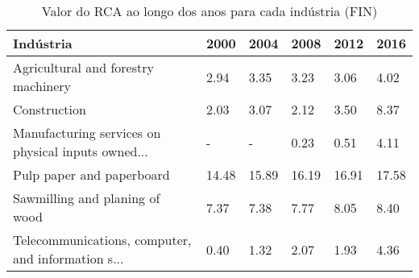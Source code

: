 \begin{table}
\centering
\caption{Valor do RCA ao longo dos anos para cada indústria (FIN)}
\begin{tabular}{p{6cm}p{1.5cm}p{1.5cm}p{1.5cm}p{1.5cm}p{1.5cm}}
\toprule
                                         Indústria &  2000 &  2004 &  2008 &  2012 &  2016 \\
\midrule
               Agricultural and forestry machinery &  2.94 &  3.35 &  3.23 &  3.06 &  4.02 \\
                                      Construction &  2.03 &  3.07 &  2.12 &  3.50 &  8.37 \\
Manufacturing services on physical inputs owned... &     - &     - &  0.23 &  0.51 &  4.11 \\
                         Pulp paper and paperboard & 14.48 & 15.89 & 16.19 & 16.91 & 17.58 \\
                    Sawmilling and planing of wood &  7.37 &  7.38 &  7.77 &  8.05 &  8.40 \\
Telecommunications, computer, and information s... &  0.40 &  1.32 &  2.07 &  1.93 &  4.36 \\
\bottomrule
\end{tabular}
\end{table}
